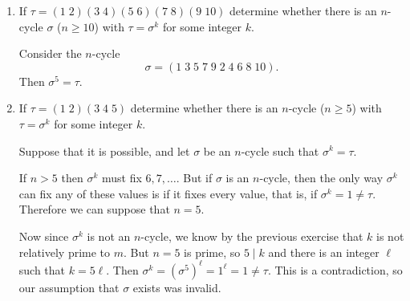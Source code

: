 \begin{enumerate}
\item If $\tau = (1\;2)(3\;4)(5\;6)(7\;8)(9\;10)$ determine whether
  there is an $n$-cycle $\sigma$ ($n\geq10$) with $\tau = \sigma^k$
  for some integer $k$.
  \begin{solution}
    Consider the $n$-cycle
    \begin{equation*}
      \sigma = (1\;3\;5\;7\;9\;2\;4\;6\;8\;10).
    \end{equation*}
    Then $\sigma^5 = \tau$.
  \end{solution}
\item If $\tau = (1\;2)(3\;4\;5)$ determine whether there is an
  $n$-cycle ($n\geq5$) with $\tau = \sigma^k$ for some integer $k$.
  \begin{solution}
    Suppose that it is possible, and let $\sigma$ be an $n$-cycle such
    that $\sigma^k = \tau$.

    If $n>5$ then $\sigma^k$ must fix $6, 7, \dots$. But if $\sigma$
    is an $n$-cycle, then the only way $\sigma^k$ can fix any of these
    values is if it fixes every value, that is, if
    $\sigma^k = 1 \neq \tau$. Therefore we can suppose that $n = 5$.

    Now since $\sigma^k$ is not an $n$-cycle, we know by the previous
    exercise that $k$ is not relatively prime to $m$. But $n = 5$ is
    prime, so $5\mid k$ and there is an integer $\ell$ such that
    $k = 5\ell$. Then
    $\sigma^k = (\sigma^5)^\ell = 1^\ell = 1\neq\tau$. This is a
    contradiction, so our assumption that $\sigma$ exists was invalid.
  \end{solution}
\end{enumerate}
